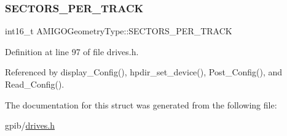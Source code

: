 \subsubsection{\texorpdfstring{S\+E\+C\+T\+O\+R\+S\+\_\+\+P\+E\+R\+\_\+\+T\+R\+A\+CK}{SECTORS\_PER\_TRACK}}
{\footnotesize\ttfamily int16\+\_\+t A\+M\+I\+G\+O\+Geometry\+Type\+::\+S\+E\+C\+T\+O\+R\+S\+\_\+\+P\+E\+R\+\_\+\+T\+R\+A\+CK}



Definition at line 97 of file drives.\+h.



Referenced by display\+\_\+\+Config(), hpdir\+\_\+set\+\_\+device(), Post\+\_\+\+Config(), and Read\+\_\+\+Config().



The documentation for this struct was generated from the following file\+:\begin{DoxyCompactItemize}
\item 
gpib/\hyperlink{drives_8h}{drives.\+h}\end{DoxyCompactItemize}
